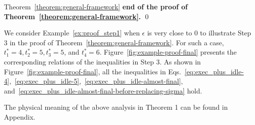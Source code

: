 \begin{appProof}{Theorem~\ref{theorem:general-framework}}
\hfill {\bf end of the proof of Theorem~\ref{theorem:general-framework}.} \qed  

\begin{example}
  We consider Example~\ref{ex:proof_step1} when $\epsilon$ is very
  close to $0$ to illustrate Step 3 in the proof of
  Theorem~\ref{theorem:general-framework}. For such a case, $t_1^*=4,
  t_2^*=5, t_3^*=5$, and $t_4^*=6$.
  Figure~\ref{fig:example-proof-final} presents the corresponding
  relations of the inequalities in Step 3. 
As shown in Figure~\ref{fig:example-proof-final}, all the inequalities 
  in Eqs.~\eqref{eq:exec_plus_idle-4},~\eqref{eq:exec_plus_idle-5},~\eqref{eq:exec_plus_idle-almost-final}, and~\eqref{eq:exec_plus_idle-almost-final-before-replacing-sigma} hold.
\end{example}
\vspace{-0.3in}
\end{appProof}
The physical meaning of the above analysis in Theorem 1 can be found
in Appendix\citetechreport{}.

